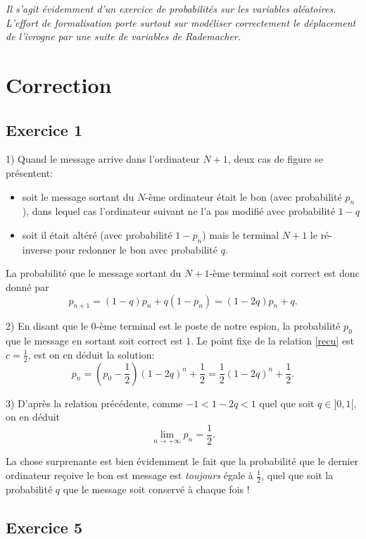 \documentclass[12pt]{article}
\theoremstyle{definition}
\begin{document}
\textit{Il s'agit évidemment d'un exercice de probabilités sur les variables aléatoires. L'effort de formalisation porte surtout sur modéliser correctement le déplacement de l'ivrogne par une suite de variables de Rademacher.}

\clearpage

\section*{Correction}

\subsection*{Exercice 1}

1) Quand le message arrive dans l'ordinateur $N+1$, deux cas de figure se présentent: \begin{itemize}
\item soit le message sortant du $N$-ème ordinateur était le bon (avec probabilité $p_n$), dans lequel cas l'ordinateur suivant ne l'a pas modifié avec probabilité $1-q$
\item soit il était altéré (avec probabilité $1-p_n$) mais le terminal $N+1$ le ré-inverse pour redonner le bon avec probabilité $q$.
\end{itemize}
La probabilité que le message sortant du $N+1$-ème terminal soit correct est donc donné par
	\[ \tag{E}\label{recu}
	p_{n+1} = (1-q) p_n + q(1-p_n) = (1-2q)p_n + q. \]

2) En disant que le $0$-ème terminal est le poste de notre espion, la probabilité $p_0$ que le message en sortant soit correct est $1$. Le point fixe de la relation \eqref{recu} est $c = \frac 12$, est on en déduit la solution:
\[
p_n = \left(p_0 - \frac 12\right)(1-2q)^n + \frac 12 = \frac 12 (1-2q)^n + \frac 12.
\]

3) D'après la relation précédente, comme $-1 < 1-2q < 1$ quel que soit $q\in{]0,1[}$, on en déduit
\[
\lim_{n\to+\infty} p_n = \frac 12.
\]

La chose surprenante est bien évidemment le fait que la probabilité que le dernier ordinateur reçoive le bon est message est \textit{toujours} égale à $\frac 12$, quel que soit la probabilité $q$ que le message soit conservé à chaque fois !

\subsection*{Exercice 5}
\end{document}

